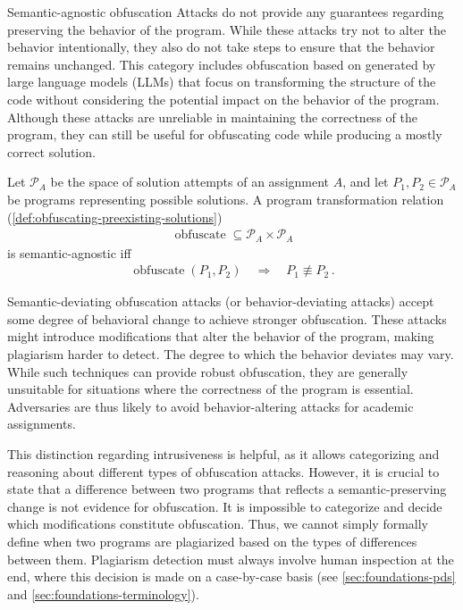 Semantic-agnostic obfuscation Attacks do not provide any guarantees regarding preserving the behavior of the program. While these attacks try not to alter the behavior intentionally, they also do not take steps to ensure that the behavior remains unchanged. This category includes obfuscation based on generated by large language models (LLMs) that focus on transforming the structure of the code without considering the potential impact on the behavior of the program. Although these attacks are unreliable in maintaining the correctness of the program, they can still be useful for obfuscating code while producing a mostly correct solution.

\begin{theorem}\label{def:sdoa}
Let  \(\mathcal{P}_A\) be the space of solution attempts of an assignment \(A\), and let \(P_1, P_2 \in \mathcal{P}_A\) be programs representing possible solutions. A program transformation relation (\autoref{def:obfuscating-preexisting-solutions})
\begin{align*}
    \operatorname{obfuscate} \subseteq \mathcal{P}_A \times \mathcal{P}_A
\end{align*}
is semantic-agnostic iff
%
\begin{align*}
    \operatorname{obfuscate}(P_1, P_2) \quad \Rightarrow \quad P_1 \not\equiv P_2 \,.
\end{align*}
\end{theorem}

Semantic-deviating obfuscation attacks (or behavior-deviating attacks) accept some degree of behavioral change to achieve stronger obfuscation. These attacks might introduce modifications that alter the behavior of the program, making plagiarism harder to detect. The degree to which the behavior deviates may vary. While such techniques can provide robust obfuscation, they are generally unsuitable for situations where the correctness of the program is essential. Adversaries are thus likely to avoid behavior-altering attacks for academic assignments.

This distinction regarding intrusiveness is helpful, as it allows categorizing and reasoning about different types of obfuscation attacks. However, it is crucial to state that a difference between two programs that reflects a semantic-preserving change is not evidence for obfuscation. It is impossible to categorize and decide which modifications constitute obfuscation. Thus, we cannot simply formally define when two programs are plagiarized based on the types of differences between them. Plagiarism detection must always involve human inspection at the end, where this decision is made on a case-by-case basis (see \autoref{sec:foundations-pds} and \autoref{sec:foundations-terminology}).


